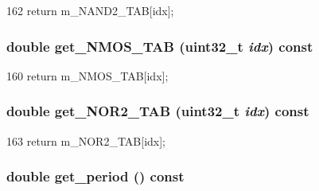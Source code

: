 \begin{DoxyCode}
162 { return m_NAND2_TAB[idx]; }
\end{DoxyCode}
\hypertarget{classTechParameter_ad11303547538a05bd16a786162cf6f21}{
\subsubsection[{get\_\-NMOS\_\-TAB}]{\setlength{\rightskip}{0pt plus 5cm}double get\_\-NMOS\_\-TAB ({\bf uint32\_\-t} {\em idx}) const}}
\label{classTechParameter_ad11303547538a05bd16a786162cf6f21}



\begin{DoxyCode}
160 { return m_NMOS_TAB[idx]; }
\end{DoxyCode}
\hypertarget{classTechParameter_a88a118640a4fc2e7eba7825caebb6187}{
\subsubsection[{get\_\-NOR2\_\-TAB}]{\setlength{\rightskip}{0pt plus 5cm}double get\_\-NOR2\_\-TAB ({\bf uint32\_\-t} {\em idx}) const}}
\label{classTechParameter_a88a118640a4fc2e7eba7825caebb6187}



\begin{DoxyCode}
163 { return m_NOR2_TAB[idx]; }
\end{DoxyCode}
\hypertarget{classTechParameter_a9951de14242f50381b40667b4fe0ad25}{
\subsubsection[{get\_\-period}]{\setlength{\rightskip}{0pt plus 5cm}double get\_\-period () const}}
\label{classTechParameter_a9951de14242f50381b40667b4fe0ad25}



